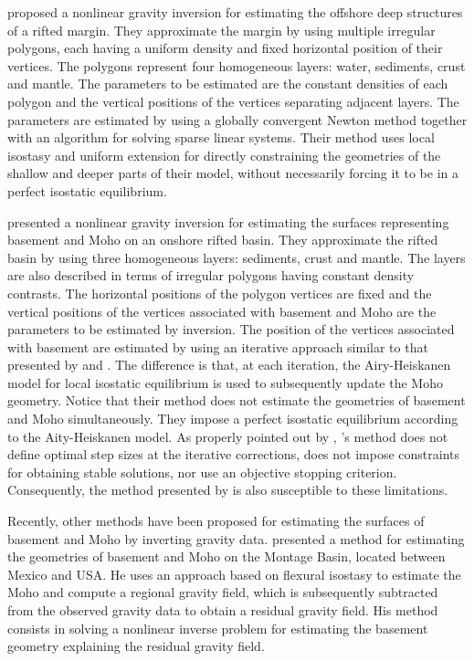 \documentclass[manuscript]{geophysics}
\begin{document}
\citet{condi-etal1999} proposed a nonlinear gravity inversion for estimating the
offshore deep structures of a rifted margin.
They approximate the margin by using multiple irregular polygons, each having a 
uniform density and fixed horizontal position of their vertices.
The polygons represent four homogeneous layers: water, sediments, crust and mantle.
The parameters to be estimated are the constant densities of each polygon and 
the vertical positions of the vertices separating adjacent layers.
The parameters are estimated by using a globally convergent Newton method
together with an algorithm for solving sparse linear systems.
Their method uses local isostasy and uniform extension for directly constraining the 
geometries of the shallow and deeper parts of their model, without necessarily
forcing it to be in a perfect isostatic equilibrium.

\citet{salem-etal2014} presented a nonlinear gravity inversion for estimating the 
surfaces representing basement and Moho on an onshore rifted basin. 
They approximate the rifted basin by using three homogeneous layers: sediments, crust and mantle.
The layers are also described in terms of irregular polygons having constant density
contrasts.
The horizontal positions of the polygon vertices are fixed and the vertical positions
of the vertices associated with basement and Moho are the parameters to be estimated by 
inversion.
The position of the vertices associated with basement are estimated 
by using an iterative approach similar to that
presented by \citet{bott1960} and \citet{cordell-henderson1968}. 
The difference is that, at each iteration, the Airy-Heiskanen model
\citep{heiskanen-moritz1967} for local isostatic equilibrium is used 
to subsequently update the Moho geometry.
Notice that their method does not estimate the geometries of basement and Moho 
simultaneously.
They impose a perfect isostatic equilibrium according to the Aity-Heiskanen model.
As properly pointed out by \citet{silva-etal2014}, \citeauthor{bott1960}'s
method does not define optimal step sizes at the iterative corrections,
does not impose constraints for obtaining stable solutions, nor use
an objective stopping criterion. 
Consequently, the method presented by \citet{salem-etal2014} is also susceptible 
to these limitations.

Recently, other methods have been proposed for estimating the surfaces of basement
and Moho by inverting gravity data.
\citet{garcia-abdeslem2017} presented a method for estimating the 
geometries of basement and Moho on the Montage Basin, located between Mexico and USA.
He uses an approach based on flexural isostasy to estimate the Moho and compute 
a regional gravity field, which is subsequently subtracted from the observed gravity 
data to obtain a residual gravity field. 
His method consists in solving a nonlinear inverse problem for estimating the
basement geometry explaining the residual gravity field.
\end{document}
